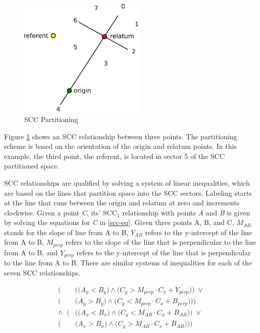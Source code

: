 \documentclass[12pt]{ucthesis}
\begin{document}
\begin{figure}[H]
\centering
\includegraphics[width=60mm]{scc}
\caption{SCC Partitioning}
\label{scc}
\end{figure}

Figure \ref{scc} shows an SCC relationship between three points. The partitioning scheme is based on the orientation of the origin and relatum points. In this example, the third point, the referent, is located in sector 5 of the SCC partitioned space. 

SCC relationships are qualified by solving a system of linear inequalities, which are based on the lines that partition space into the SCC sectors. Labeling starts at the line that runs between the origin and relatum at zero and increments clockwise. Given a point \emph{C}, its' SCC$_{1}$ relationship with points \emph{A} and \emph{B} is given by solving the equations for \emph{C} in \ref{scc-eq}. Given three points A, B, and C, $M_{AB}$ stands for the slope of line from A to B, $Y_{AB}$ refers to the y-intercept of the line from A to B, $M_{perp}$ refers to the slope of the line that is perpendicular to the line from A to B, and $Y_{perp}$ refers to the y-intercept of the line that is perpendicular to the line from A to B. There are similar systems of inequalities for each of the seven SCC relationships.  

\begin{equation}\label{scc-eq}
\begin{aligned}
\Big(&\Big(\Big(A_{y} < B_{y}\Big) \wedge \Big(C_{y} > M_{perp} \cdot C_{x} + Y_{perp}\Big)\Big) \; \lor \\
\Big(&\Big(A_{y} > B_{y}\Big) \wedge \Big(C_{y} < M_{perp} \cdot C_{x} + B_{perp}\Big)\Big)\Big) \\
\wedge \;\; \Big(&\Big(\Big(A_{x} < B_{x}\Big) \wedge \Big(C_{y} < M_{AB} \cdot C_{x} + B_{AB}\Big)\Big) \; \lor \\
\Big(&\Big(A_{x} > B_{x}\Big) \wedge \Big(C_{y} > M_{AB} \cdot C_{x} + B_{AB}\Big)\Big)\Big) \\
\end{aligned}
\end{equation}
\end{document}
